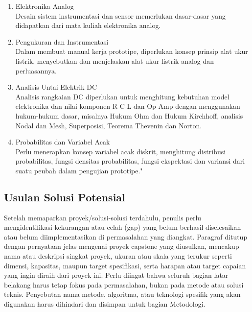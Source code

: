 \begin{enumerate}[label=\alph*.]
        Tim mahasiswa dari TIF perlu membuat sistem interface yang tapat dan mendesain algoritme yang kompleks oleh kerana itu diperlukan mata kuliah ini.
        \item Elektronika Analog\\
        Desain sistem instrumentasi dan sensor memerlukan dasar-dasar yang didapatkan dari mata kuliah elektronika analog.
        \item Pengukuran dan Instrumentasi\\
        Dalam membuat manual kerja prototipe, diperlukan konsep prinsip alat ukur listrik, menyebutkan dan menjelaskan alat ukur listrik analog dan perluasannya.
        \item Analisis Untai Elektrik DC\\
        Analisis rangkaian DC diperlukan untuk menghitung kebutuhan model elektronika dan nilai komponen R-C-L dan Op-Amp dengan menggunakan hukum-hukum dasar, misalnya Hukum Ohm dan Hukum Kirchhoff, analisis Nodal dan Mesh, Superposisi, Teorema Thevenin dan Norton.
        \item Probabilitas dan Variabel Acak\\
        Perlu menerapkan konsep variabel acak diskrit, menghitung distribusi probabilitas, fungsi densitas probabilitas, fungsi ekspektasi dan variansi dari suatu peubah dalam pengujian prototipe."
    \end{enumerate}

\subsection{Usulan Solusi Potensial} 
\label{subsec:Solusi Potensial}
Setelah memaparkan proyek/solusi-solusi terdahulu, penulis perlu mengidentifikasi kekurangan atau celah (gap) yang belum berhasil diselesaikan atau belum diimplementasikan di permasalahan yang diangkat. Paragraf ditutup dengan pernyataan jelas mengenai proyek capstone yang diusulkan, mencakup nama atau deskripsi singkat proyek, ukuran atau skala yang terukur seperti dimensi, kapasitas, maupun target spesifikasi, serta harapan atau target capaian yang ingin diraih dari proyek ini. Perlu diingat bahwa seluruh bagian latar belakang harus tetap fokus pada permasalahan, bukan pada metode atau solusi teknis. Penyebutan nama metode, algoritma, atau teknologi spesifik yang akan digunakan harus dihindari dan disimpan untuk bagian Metodologi.
